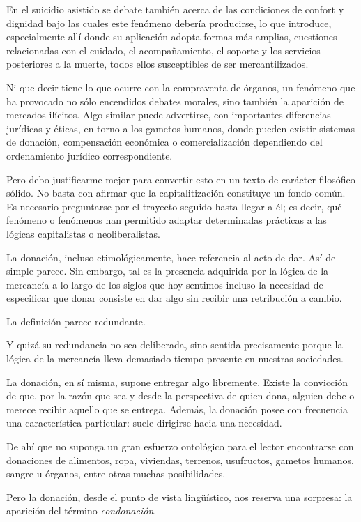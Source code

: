 \documentclass[12pt]{article}
\begin{document}
En el suicidio asistido se debate también acerca de las condiciones de confort y dignidad bajo las cuales este fenómeno debería producirse, lo que introduce, especialmente allí donde su aplicación adopta formas más amplias, cuestiones relacionadas con el cuidado, el acompañamiento, el soporte y los servicios posteriores a la muerte, todos ellos susceptibles de ser mercantilizados.

Ni que decir tiene lo que ocurre con la compraventa de órganos, un fenómeno que ha provocado no sólo encendidos debates morales, sino también la aparición de mercados ilícitos. Algo similar puede advertirse, con importantes diferencias jurídicas y éticas, en torno a los gametos humanos, donde pueden existir sistemas de donación, compensación económica o comercialización dependiendo del ordenamiento jurídico correspondiente.

Pero debo justificarme mejor para convertir esto en un texto de carácter filosófico sólido. No basta con afirmar que la capitalitización constituye un fondo común. Es necesario preguntarse por el trayecto seguido hasta llegar a él; es decir, qué fenómeno o fenómenos han permitido adaptar determinadas prácticas a las lógicas capitalistas o neoliberalistas.

La donación, incluso etimológicamente, hace referencia al acto de dar. Así de simple parece. Sin embargo, tal es la presencia adquirida por la lógica de la mercancía a lo largo de los siglos que hoy sentimos incluso la necesidad de especificar que donar consiste en dar algo sin recibir una retribución a cambio.

La definición parece redundante.

Y quizá su redundancia no sea deliberada, sino sentida precisamente porque la lógica de la mercancía lleva demasiado tiempo presente en nuestras sociedades.

La donación, en sí misma, supone entregar algo libremente. Existe la convicción de que, por la razón que sea y desde la perspectiva de quien dona, alguien debe o merece recibir aquello que se entrega. Además, la donación posee con frecuencia una característica particular: suele dirigirse hacia una necesidad.

De ahí que no suponga un gran esfuerzo ontológico para el lector encontrarse con donaciones de alimentos, ropa, viviendas, terrenos, usufructos, gametos humanos, sangre u órganos, entre otras muchas posibilidades.

Pero la donación, desde el punto de vista lingüístico, nos reserva una sorpresa: la aparición del término \emph{condonación}.
\end{document}
